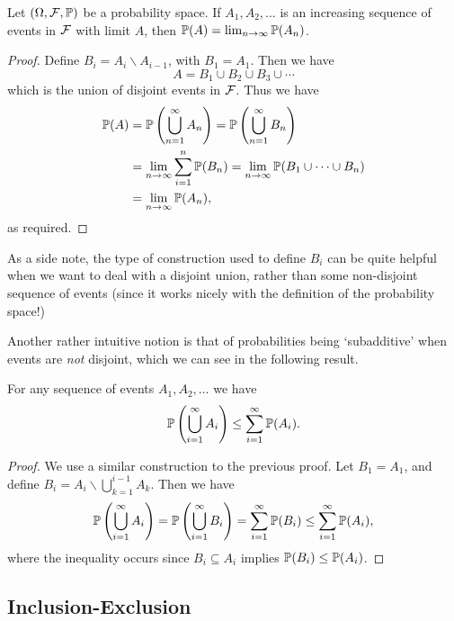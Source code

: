 \documentclass[a4paper]{scrartcl}
\begin{document}
\begin{theorem}
	Let $(\Omega, \mathcal{F},\mathbb{P})$ be a probability space. If $A_1, A_2, \dots$ is an increasing sequence of events in $\mathcal{F}$ with limit $A$, then $\mathbb{P}(A) = \lim_{n \to \infty} \mathbb{P}(A_n)$.
\end{theorem}
\begin{proof}
	Define $B_i = A_i \backslash A_{i - 1}$, with $B_1 = A_1$. Then we have
	$$
A = B_1 \cup B_2 \cup B_3 \cup \cdots
	$$
	which is the union of disjoint events in $\mathcal{F}$. Thus we have
	\begin{align*}
		\mathbb{P}(A) &= \mathbb{P}\left(\bigcup_{n = 1}^{\infty} A_n\right) = \mathbb{P}\left(\bigcup_{n = 1}^{\infty} B_n\right) \\
		&= \lim_{n \to \infty} \sum_{i = 1}^{n} \mathbb{P}(B_n) = \lim_{n \to \infty} \mathbb{P}(B_1 \cup \cdots \cup B_n) \\ &= \lim_{n \to \infty} \mathbb{P}(A_n),
	\end{align*}
	as required.
\end{proof}

As a side note, the type of construction used to define $B_i$ can be quite helpful when we want to deal with a disjoint union, rather than some non-disjoint sequence of events (since it works nicely with the definition of the probability space!)

Another rather intuitive notion is that of probabilities being `subadditive' when events are \emph{not} disjoint, which we can see in the following result.

\begin{theorem}
	For any sequence of events $A_1, A_2, \dots$ we have
	$$
	\mathbb{P}\left(\bigcup_{i = 1}^{\infty} A_i\right) \leq \sum_{i = 1}^{\infty} \mathbb{P}(A_i).
	$$
\end{theorem}
\begin{proof}
	We use a similar construction to the previous proof. Let $B_1 = A_1$, and define $B_i = A_i \backslash \bigcup_{k = 1}^{i - 1} A_k$. Then we have
	$$
	\mathbb{P}\left(\bigcup_{i = 1}^{\infty} A_i\right) = \mathbb{P}\left(\bigcup_{i = 1}^{\infty} B_i\right) = \sum_{i = 1}^{\infty} \mathbb{P}(B_i) \leq \sum_{i = 1}^{\infty} \mathbb{P}(A_i),
	$$
	where the inequality occurs since $B_i \subseteq A_i$ implies $\mathbb{P}(B_i) \leq \mathbb{P}(A_i)$.
\end{proof}

\subsection{Inclusion-Exclusion}
\end{document}
